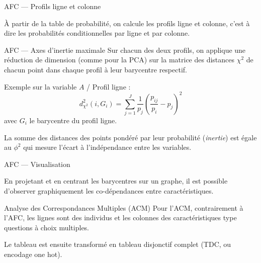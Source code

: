 \begin{frame}{AFC --- Profils ligne et colonne}
  \begin{minipage}{0.45\linewidth}
  \end{minipage}
  \hfill
  \begin{minipage}{0.45\linewidth}
  \end{minipage}

  À partir de la table de probabilité, on calcule les profils ligne et colonne, c'est à dire les probabilités conditionnelles par ligne et par colonne.
\end{frame}

\begin{frame}{AFC --- Axes d'inertie maximale}
  Sur chacun des deux profils, on applique une réduction de dimension (comme pour la PCA) sur la matrice des distances $\chi^2$ de chacun point dans chaque profil à leur barycentre respectif.

  Exemple sur la variable $A$ / Profil ligne :
  \begin{equation*}
    d_{\chi^2}^2(i,G_i) = \sum^J_{j=1}\frac{1}{p_j}\left(\frac{p_{ij}}{p_i} - p_j \right)^2 
  \end{equation*}
  avec $G_i$ le barycentre du profil ligne.

  La somme des distances des points pondéré par leur probabilité (\emph{inertie}) est égale au $\phi^2$ qui mesure l'écart à l'indépendance entre les variables.
\end{frame}

\begin{frame}{AFC --- Visualisation}
  \begin{minipage}{0.59\linewidth}
  \end{minipage}
  \begin{minipage}{0.4\linewidth}
    En projetant et en centrant les barycentres sur un graphe, il est possible d'observer graphiquement les co-dépendances entre caractéristiques.
  \end{minipage}
\end{frame}

\begin{frame}{Analyse des Correspondances Multiples (ACM)}
  Pour l'ACM, contrairement à l'AFC, les lignes sont des individus et les colonnes des caractéristiques type questions à choix multiples.
  \begin{center}
  \end{center}
  Le tableau est ensuite transformé en tableau disjonctif complet (TDC, ou encodage one hot).
\end{frame}

